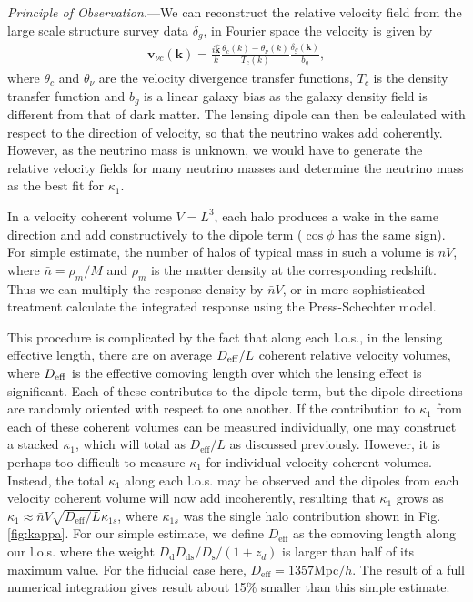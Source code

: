 \documentclass[aps,prl,twocolumn,showpacs,superscriptaddress,groupedaddress,nofootinbib]{revtex4}  %
\newcommand{\mr}{\mathrm}
\begin{document}
{\it Principle of Observation.}---We can reconstruct the relative 
velocity field from the large scale structure 
survey data  $\delta_g$, in Fourier space the velocity is given by
\begin{eqnarray}
  \bm{v}_{\nu c} (\bm{k})= \frac{i\hat{\bm{k}}}{k}\frac{\theta_c(k) -
    \theta_\nu(k)}{T_c(k)}\frac{\delta_g(\bm{k})}{b_g},
  \label{eqn:flinvel}
\end{eqnarray}
where $\theta_c$ and $\theta_\nu$ are the velocity divergence 
transfer functions, $T_c$ is
the density transfer function and $b_g$ is a linear galaxy bias as 
the galaxy density field is different from that of dark matter. 
The lensing dipole can then be calculated with respect to the direction of velocity, so that 
the neutrino wakes add coherently. However, as the neutrino mass is unknown,
we would have to generate the relative velocity fields for many
neutrino masses and determine the neutrino mass as the best fit for
$\kappa_1$. 



In a velocity coherent volume $V=L^3$, 
each halo produces a wake in
the same direction and add constructively to the dipole term
($\cos\phi$ has the same sign).  For simple estimate, the number of
halos of typical mass in such a volume is $\bar{n} V$, where
$\bar{n}=\rho_m/M$ and $\rho_m$ is the matter density at the
corresponding redshift. 
Thus we can multiply the response density by $\bar{n} V$, or
in more sophisticated treatment calculate the integrated response using the 
Press-Schechter model.

This procedure is complicated by the fact that along each l.o.s., in
the lensing effective length, there are on average $D_{\rm eff}/L$
coherent relative velocity volumes, where $D_{\rm eff}$ is the effective
comoving length over which the lensing effect is significant. 
Each of these contributes to the dipole term, but the dipole directions are randomly oriented with
respect to one another. If the contribution to $\kappa_1$ from each of
these coherent volumes can be measured individually, one may construct
a stacked $\kappa_1$, which will total as $D_\mr{eff}/L$ as discussed
previously.  However, it is perhaps too difficult to measure $\kappa_1$
for individual velocity coherent volumes. Instead, the total
$\kappa_1$ along each l.o.s.  may be observed and the dipoles from
each velocity coherent volume will now add incoherently, resulting  
that $\kappa_1$ grows as $\kappa_1\approx \bar{n}V\sqrt{D_\mr{eff}/L} \kappa_{1s}$, where
$\kappa_{1s}$ was the single halo contribution shown in Fig.\ref{fig:kappa}. For our simple estimate,
we define $D_\mr{eff}$ as the comoving length along our l.o.s.  where the weight
$D_\mr{d}D_\mr{ds}/D_\mr{s}/(1+z_d)$ is larger than half of its maximum
value. For the fiducial case here, $D_\mr{eff}=1357$Mpc$/h$. The result of a full
numerical integration gives result about 15\% smaller than this simple estimate.
\end{document}
